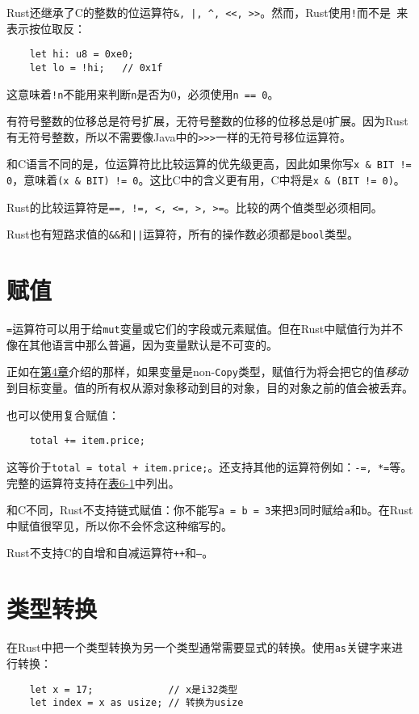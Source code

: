Rust还继承了C的整数的位运算符\texttt{\&, |, \^{}, <<, >>}。然而，Rust使用\texttt{!}而不是\texttt{~}来表示按位取反：
\begin{verbatim}
    let hi: u8 = 0xe0;
    let lo = !hi;   // 0x1f
\end{verbatim}

这意味着\texttt{!n}不能用来判断\texttt{n}是否为0，必须使用\texttt{n == 0}。

有符号整数的位移总是符号扩展，无符号整数的位移的位移总是0扩展。因为Rust有无符号整数，所以不需要像Java中的\texttt{>>>}一样的无符号移位运算符。

和C语言不同的是，位运算符比比较运算的优先级更高，因此如果你写\texttt{x \& BIT != 0}，意味着\texttt{(x \& BIT) != 0}。这比C中的含义更有用，C中将是\texttt{x \& (BIT != 0)}。

Rust的比较运算符是\texttt{==, !=, <, <=, >, >=}。比较的两个值类型必须相同。

Rust也有短路求值的\texttt{\&\&}和\texttt{||}运算符，所有的操作数必须都是\texttt{bool}类型。

\section{赋值}

\texttt{=}运算符可以用于给\texttt{mut}变量或它们的字段或元素赋值。但在Rust中赋值行为并不像在其他语言中那么普遍，因为变量默认是不可变的。

正如在\hyperref[ch04]{第4章}介绍的那样，如果变量是non-\texttt{Copy}类型，赋值行为将会把它的值\emph{移动}到目标变量。值的所有权从源对象移动到目的对象，目的对象之前的值会被丢弃。

也可以使用复合赋值：
\begin{verbatim}
    total += item.price;
\end{verbatim}

这等价于\texttt{total = total + item.price;}。还支持其他的运算符例如：\texttt{-=, *=}等。完整的运算符支持在\hyperref[t6-1]{表6-1}中列出。

和C不同，Rust不支持链式赋值：你不能写\texttt{a = b = 3}来把\texttt{3}同时赋给\texttt{a}和\texttt{b}。在Rust中赋值很罕见，所以你不会怀念这种缩写的。

Rust不支持C的自增和自减运算符\texttt{++}和\texttt{--}。

\section{类型转换}\label{cast}

在Rust中把一个类型转换为另一个类型通常需要显式的转换。使用\texttt{as}关键字来进行转换：
\begin{verbatim}
    let x = 17;             // x是i32类型
    let index = x as usize; // 转换为usize
\end{verbatim}

